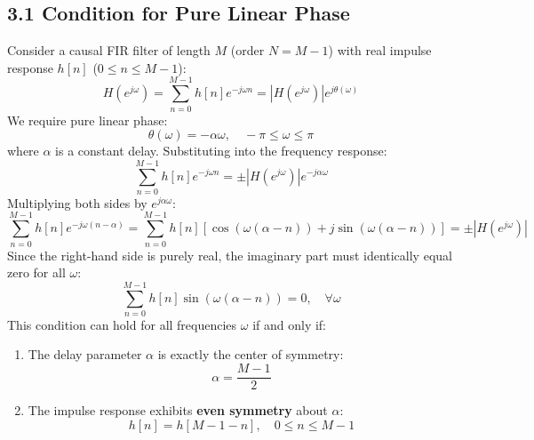 \documentclass[11pt,a4paper]{article}
\begin{document}
\subsection{3.1 Condition for Pure Linear Phase}
Consider a causal FIR filter of length $M$ (order $N = M-1$) with real impulse response $h[n]$ ($0 \le n \le M-1$):
\begin{equation}
H(e^{j\omega}) = \sum_{n=0}^{M-1} h[n] e^{-j\omega n} = |H(e^{j\omega})| e^{j\theta(\omega)}
\end{equation}
We require pure linear phase:
\begin{equation}
\theta(\omega) = -\alpha \omega, \quad -\pi \le \omega \le \pi
\end{equation}
where $\alpha$ is a constant delay. Substituting into the frequency response:
\begin{equation}
\sum_{n=0}^{M-1} h[n] e^{-j\omega n} = \pm |H(e^{j\omega})| e^{-j\alpha\omega}
\end{equation}
Multiplying both sides by $e^{j\alpha\omega}$:
\begin{equation}
\sum_{n=0}^{M-1} h[n] e^{-j\omega(n - \alpha)} = \sum_{n=0}^{M-1} h[n] \left[ \cos(\omega(\alpha - n)) + j \sin(\omega(\alpha - n)) \right] = \pm |H(e^{j\omega})|
\end{equation}
Since the right-hand side is purely real, the imaginary part must identically equal zero for all $\omega$:
\begin{equation}
\sum_{n=0}^{M-1} h[n] \sin(\omega(\alpha - n)) = 0, \quad \forall \omega
\end{equation}
This condition can hold for all frequencies $\omega$ if and only if:
\begin{enumerate}
    \item The delay parameter $\alpha$ is exactly the center of symmetry:
    \begin{equation}
    \alpha = \frac{M-1}{2}
    \end{equation}
    \item The impulse response exhibits \textbf{even symmetry} about $\alpha$:
    \begin{equation}
    h[n] = h[M - 1 - n], \quad 0 \le n \le M - 1
    \end{equation}
\end{enumerate}
\end{document}
